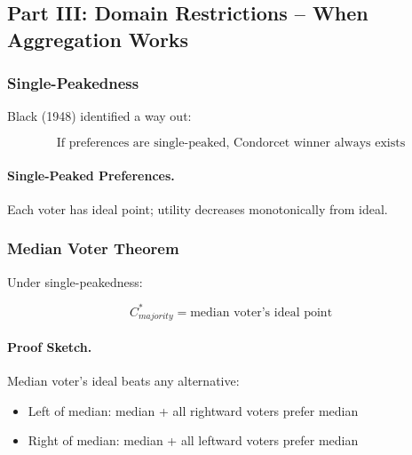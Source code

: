 \subsection{Part III: Domain Restrictions – When Aggregation Works}

\subsubsection{Single-Peakedness}

Black (1948) identified a way out:

\begin{equation}
\boxed{
\text{If preferences are single-peaked, Condorcet winner always exists}
}
\label{eq:singlepeaked}
\end{equation}

\paragraph{Single-Peaked Preferences.}
Each voter has ideal point; utility decreases monotonically from ideal.

\begin{center}
\end{center}

\subsubsection{Median Voter Theorem}

Under single-peakedness:

\begin{equation}
\boxed{
C^*_{majority} = \text{median voter's ideal point}
}
\label{eq:medianvoter}
\end{equation}

\paragraph{Proof Sketch.}
Median voter's ideal beats any alternative:
\begin{itemize}
    \item Left of median: median + all rightward voters prefer median
    \item Right of median: median + all leftward voters prefer median
\end{itemize}

